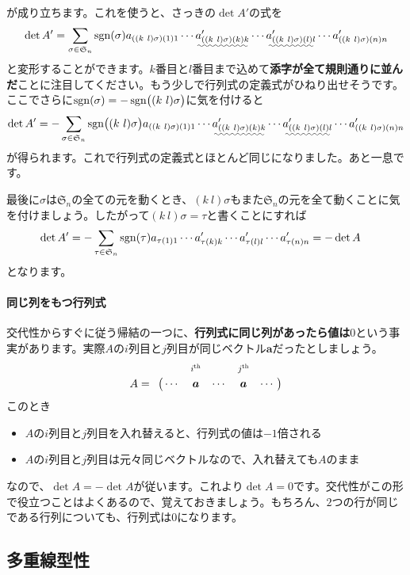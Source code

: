 が成り立ちます。これを使うと、さっきの$\det A'$の式を
\[
\det A'
= \sum_{\sigma \in \mathfrak{S}_n} \sgn(\sigma) a_{((k\ l) \sigma)(1)1} \cdots \uwave{a'_{((k\ l) \sigma)(k)k}} \cdots \uwave{a'_{((k\ l) \sigma)(l)l}} \cdots a'_{((k\ l) \sigma)(n)n} \\
\]
と変形することができます。$k$番目と$l$番目まで込めて\textbf{添字が全て規則通りに並んだ}ことに注目してください。もう少しで行列式の定義式がひねり出せそうです。ここでさらに$\operatorname{sgn}(\sigma) = - \operatorname{sgn}\bigl((k\ l) \sigma\bigr)$に気を付けると
\[
\det A'
= - \sum_{\sigma \in \mathfrak{S}_n} \sgn\bigl((k\ l) \sigma\bigr) a_{((k\ l) \sigma)(1)1} \cdots \uwave{a'_{((k\ l) \sigma)(k)k}} \cdots \uwave{a'_{((k\ l) \sigma)(l)l}} \cdots a'_{((k\ l) \sigma)(n)n} \\
\]
が得られます。これで行列式の定義式とほとんど同じになりました。あと一息です。

最後に$\sigma$は$\mathfrak{S}_n$の全ての元を動くとき、$(k\ l) \sigma$もまた$\mathfrak{S}_n$の元を全て動くことに気を付けましょう。したがって$(k\ l) \sigma = \tau$と書くことにすれば
\begin{align*}
\det A'
&= -\sum_{\tau \in \mathfrak{S}_n} \operatorname{sgn}(\tau) a_{\tau(1)1} \cdots a'_{\tau(k)k} \cdots a'_{\tau(l)l} \cdots a'_{\tau(n)n}
= - \det A
\end{align*}
となります。

\paragraph{同じ列をもつ行列式}

交代性からすぐに従う帰結の一つに、\textbf{行列式に同じ列があったら値は$0$}という事実があります。実際$A$の$i$列目と$j$列目が同じベクトル$\bm{a}$だったとしましょう。
\[
A = \bordermatrix{
& & \scalebox{0.8}{$i^{\text{th}}$} & & \scalebox{0.8}{$j^\text{th}$} \cr
& \cdots & \bm{a} & \cdots & \bm{a} & \cdots
}
\]
このとき
\begin{itemize}
\item $A$の$i$列目と$j$列目を入れ替えると、行列式の値は$-1$倍される
\item $A$の$i$列目と$j$列目は元々同じベクトルなので、入れ替えても$A$のまま
\end{itemize}
なので、$\det A = - \det A$が従います。これより$\det A = 0$です。交代性がこの形で役立つことはよくあるので、覚えておきましょう。もちろん、$2$つの行が同じである行列についても、行列式は$0$になります。


\subsection{多重線型性}

